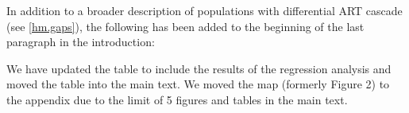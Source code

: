 \begin{comment}
Although the authors explain why modelling key populations might influence the predicted impact of ART on HIV incidence, I think the introduction would be strengthened if they also mentioned the literature that covers heterogeneity more broadly - and the role that heterogeneity plays in determining intervention impact. For example, Nagelkerke et al (2007, BMC Infectious Diseases, 7:16) showed that the modelled impact of male circumcision on HIV incidence was much greater when assuming no heterogeneity in risk behaviour, Johnson et al (2012, Journal of the Royal Society Interface, 9:1544-54) showed that the modelled impact of condoms and ART was strongly correlated with the heterogeneity in risk behaviour, and Hontelez et al (2013, PLoS Medicine, 10:e1001534) showed that allowing for heterogeneity reduced the predicted impact of ART on HIV incidence. Key populations are one component of the heterogeneity-impact relationship, but the introduction currently reads as if they are the only determinant of the relationship.
\end{comment}
\begin{response}
In addition to a broader description of populations with differential ART cascade (see \ref{hm.gaps}),
the following has been added to the beginning of the last paragraph in the introduction:
\end{response}
\begin{comment}\label{tab:c1}
Given that the results from Table C1 are so central to the overall conclusion of the paper (and are referred to in the abstract), it seems strange to put this table in the supplementary materials. I think it would be more appropriate to include this table in the main text of the article.
\end{comment}
\begin{response}
We have updated the table to include the results of the regression analysis and moved the table into the main text.
We moved the map (formerly Figure 2) to the appendix due to the limit of 5 figures and tables in the main text.
\end{response}
